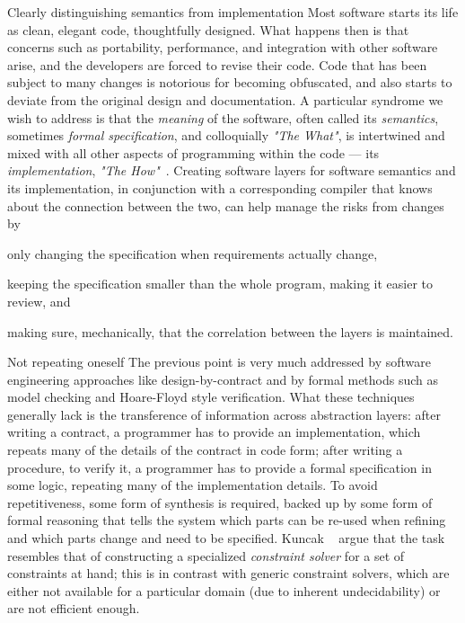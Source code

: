 \begin{subparagraph}{Clearly distinguishing semantics from implementation}
Most software starts its life as clean, elegant code, thoughtfully designed.
What happens then is that concerns such as portability, performance,
and integration with other software arise, and the developers are forced
to revise their code.
Code that has been subject to many changes is notorious for becoming
obfuscated, and also starts to deviate from the original design and
documentation.
A particular syndrome we wish to address is that the \emph{meaning} of
the software, often called its \emph{semantics}, sometimes \emph{formal specification},
and colloquially \emph{"The What"}, is intertwined and mixed with all
other aspects of programming within the code --- its \emph{implementation},
\emph{"The How"}~\cite{CACM2012/Bodik}.
Creating software layers for software semantics and its implementation,
in conjunction with a corresponding compiler that knows about the connection
between the two, can help manage the risks from changes by
\begin{enumerate*}[label=(\textit{\roman*})]
\item only changing the
specification when requirements actually change, 
\item keeping the specification smaller than the whole program, making it easier to review, and
\item making sure, mechanically, that the correlation between the layers is maintained.
\end{enumerate*}
\end{subparagraph}

\begin{subparagraph}{Not repeating oneself}
The previous point is very much addressed by software engineering approaches
like design-by-contract and by formal methods such as model checking and Hoare-Floyd
style verification.
What these techniques generally lack is the transference of information across
abstraction layers:
after writing a contract, a programmer has to provide an implementation,
which repeats many of the details of the contract in code form;
after writing a procedure, to verify it, a programmer has to provide a formal
specification in some logic, repeating many of the implementation details.
To avoid repetitiveness, some form of synthesis is required, backed up by some
form of formal reasoning that tells the system which parts can be re-used when
refining and which parts change and need to be specified.
Kuncak \etal~\cite{CACM2012/Kuncak} argue that the task resembles that of
constructing a specialized \emph{constraint solver} for a set of constraints
at hand; this is in contrast with generic constraint solvers, which are
either not available for a particular domain (due to inherent undecidability)
or are not efficient enough.
\end{subparagraph}

